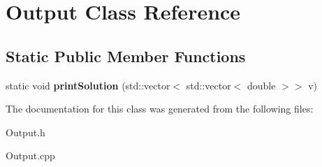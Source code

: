 \hypertarget{class_output}{}\section{Output Class Reference}
\label{class_output}
\subsection*{Static Public Member Functions}
\begin{DoxyCompactItemize}
\item 
\mbox{\label{class_output_a97f96caf0cafae93dad6f4faedb1fe25}} 
static void {\bfseries print\+Solution} (std\+::vector$<$ std\+::vector$<$ double $>$$>$ v)
\end{DoxyCompactItemize}


The documentation for this class was generated from the following files\+:\begin{DoxyCompactItemize}
\item 
Output.\+h\item 
Output.\+cpp\end{DoxyCompactItemize}
